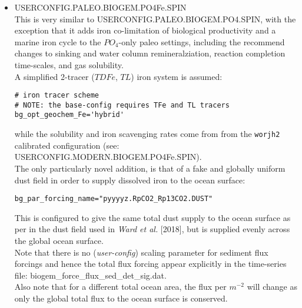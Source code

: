 \documentclass[11pt,fleqn]{book} %
\begin{document}
\begin{itemize}[noitemsep]
\vspace{2mm}
\item \textsf{\small USERCONFIG.PALEO.BIOGEM.PO4Fe.SPIN}
\vspace{1mm}
\\This is very similar to \textsf{\footnotesize USERCONFIG.PALEO.BIOGEM.PO4.SPIN}, with the exception that it adds iron co-limitation of biological productivity and a marine iron cycle to the \(PO_{4}\)-only paleo settings, including the recommend changes to sinking and water column remineralziation, reaction completion time-scales, and gas solubility.
\\A simplified 2-tracer (\(TDFe\), \(TL\)) iron system is assumed:
\small\vspace{-1mm}\begin{verbatim}
# iron tracer scheme
# NOTE: the base-config requires TFe and TL tracers
bg_opt_geochem_Fe='hybrid'
\end{verbatim}\vspace{-1mm}\normalsize
while the solubility and iron scavenging rates  come from from the \texttt{worjh2} calibrated configuration (see: \textsf{\footnotesize USERCONFIG.MODERN.BIOGEM.PO4Fe.SPIN}).
\\The only particularly novel addition, is that of a fake and globally uniform dust field in order to supply dissolved iron to the ocean surface:
\small\vspace{-1mm}\begin{verbatim}
bg_par_forcing_name="pyyyyz.RpCO2_Rp13CO2.DUST"
\end{verbatim}\vspace{-1mm}\normalsize
This is configured to give the same total dust supply to the ocean surface as per in the dust field used in \textit{Ward et al.} [2018], but is supplied evenly across the global ocean surface.
\\Note that there is no (\textit{user-config}) scaling parameter for sediment flux forcings and hence the total flux forcing appear explicitly in the time-series file: \textsf{\footnotesize biogem\_force\_flux\_sed\_det\_sig.dat}.
\\Also note that for a different total ocean area, the flux per \(m^{-2}\) will change as only the global total flux to the ocean surface is conserved.


\end{itemize}
\end{document}
